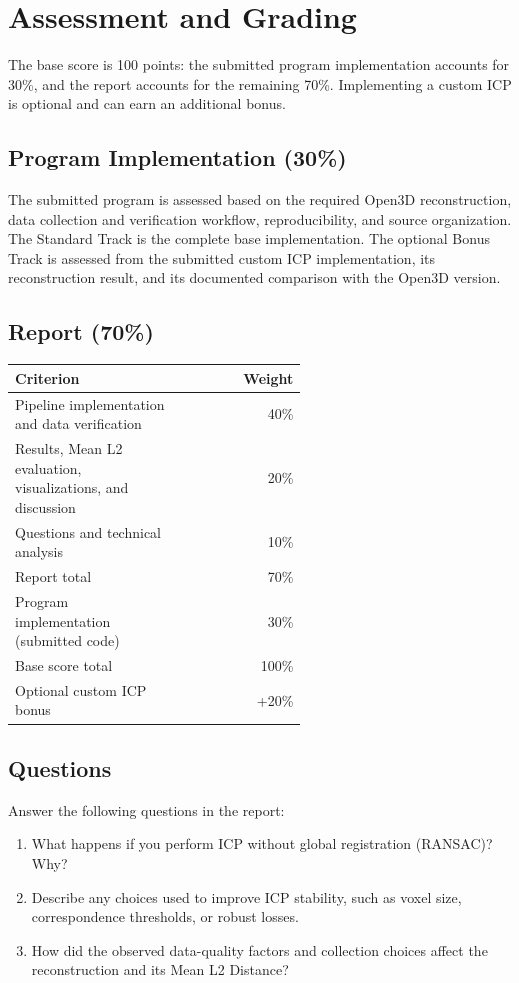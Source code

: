 \documentclass[11pt]{article}
\begin{document}
\section{Assessment and Grading}
The base score is 100 points: the submitted program implementation accounts for 30\%, and the report accounts for the remaining 70\%. Implementing a custom ICP is optional and can earn an additional bonus.

\subsection{Program Implementation (30\%)}
The submitted program is assessed based on the required Open3D reconstruction, data collection and verification workflow, reproducibility, and source organization. The Standard Track is the complete base implementation. The optional Bonus Track is assessed from the submitted custom ICP implementation, its reconstruction result, and its documented comparison with the Open3D version.

\subsection{Report (70\%)}
\begin{center}
\begin{tabular}{L{0.58\linewidth} r}
\toprule
\textbf{Criterion} & \textbf{Weight} \\
\midrule
Pipeline implementation and data verification & 40\% \\
Results, Mean L2 evaluation, visualizations, and discussion & 20\% \\
Questions and technical analysis & 10\% \\
\midrule
Report total & 70\% \\
\midrule
Program implementation (submitted code) & 30\% \\
Base score total & 100\% \\
Optional custom ICP bonus & +20\% \\
\bottomrule
\end{tabular}
\end{center}

\subsection{Questions}
Answer the following questions in the report:
\begin{enumerate}
\item What happens if you perform ICP without global registration (RANSAC)? Why?
\item Describe any choices used to improve ICP stability, such as voxel size, correspondence thresholds, or robust losses.
\item How did the observed data-quality factors and collection choices affect the reconstruction and its Mean L2 Distance?
\end{enumerate}
\end{document}
